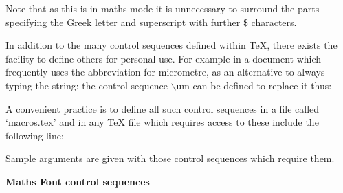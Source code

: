 Note that as this is in maths mode it is unnecessary to surround the
parts specifying the Greek letter and superscript with further \$ characters.



In addition to the many control sequences defined within \TeX, there exists
the facility to define others for personal use.
For example in a document which frequently uses the abbreviation for
micrometre, as an alternative to always typing the string:
\medskip
{}
the control sequence $\backslash$um can be defined to replace it thus:
\medskip
{}

\rm
A convenient practice is to define all such control sequences in a file
called `macros.tex' and in any {\TeX} file which requires access to these
include the following line:
\medskip
{}

\vfill\eject


\nobreak

Sample arguments are given with those control sequences which
require them.

\nobreak


    


{\bf  Maths Font control sequences}
\medskip


